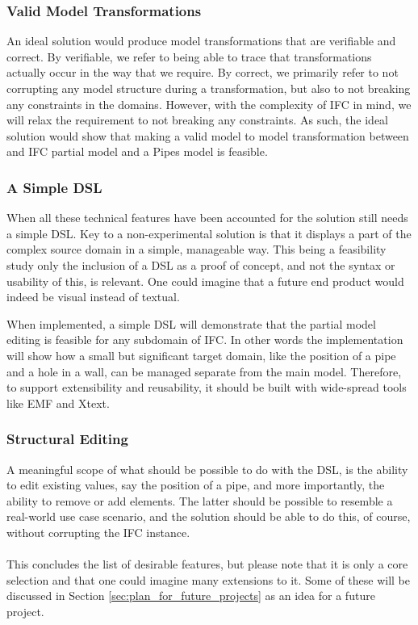 \subsubsection{Valid Model Transformations}
An ideal solution would produce model transformations that are verifiable and correct. By verifiable, we refer to being able to trace that transformations actually occur in the way that we require. By correct, we primarily refer to not corrupting any model structure during a transformation, but also to not breaking any constraints in the domains. However, with the complexity of IFC in mind, we will relax the requirement to not breaking any constraints. As such, the ideal solution would show that making a valid model to model transformation between and IFC partial model and a Pipes model is feasible.

\subsubsection{A Simple DSL}
When all these technical features have been accounted for the solution still needs a simple DSL. Key to a non-experimental solution is that it displays a part of the complex source domain in a simple, manageable way.  This being a feasibility study only the inclusion of a DSL as a proof of concept, and not the syntax or usability of this, is relevant. One could imagine that a future end product would indeed be visual instead of textual.

When implemented, a simple DSL will demonstrate that the partial model editing is feasible for any subdomain of IFC. In other words the implementation will show how a small but significant target domain, like the position of a pipe and a hole in a wall, can be managed separate from the main model. Therefore, to support extensibility and reusability, it should be built with wide-spread tools like EMF and Xtext.

\subsubsection{Structural Editing}
A meaningful scope of what should be possible to do with the DSL, is the ability to edit existing values, say the position of a pipe, and more importantly, the ability to remove or add elements. The latter should be possible to resemble a real-world use case scenario, and the solution should be able to do this, of course, without corrupting the IFC instance.
\paragraph{}
This concludes the list of desirable features, but please note that it is only a core selection and that one could imagine many extensions to it. Some of these will be discussed in Section \ref{sec:plan_for_future_projects} as an idea for a future project.

